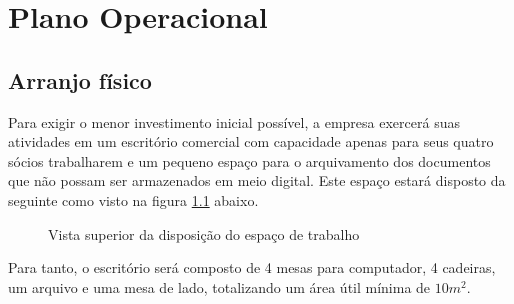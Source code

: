 \chapter{Plano Operacional}

\section{Arranjo físico}
Para exigir o menor investimento inicial possível, a empresa exercerá suas atividades em um escritório comercial com capacidade apenas para seus quatro sócios trabalharem e um pequeno espaço para o arquivamento dos documentos que não possam ser armazenados em meio digital. Este espaço estará disposto da seguinte como visto na figura \ref{fig:escritorio} abaixo.

\begin{figure}[!h]
  \begin{center}
    \caption{Vista superior da disposição do espaço de trabalho}
    \label{fig:escritorio}
  \end{center}
\end{figure}

Para tanto, o escritório será composto de 4 mesas para computador, 4 cadeiras, um arquivo e uma mesa de lado, totalizando um área útil mínima de $10m^{2}$.
